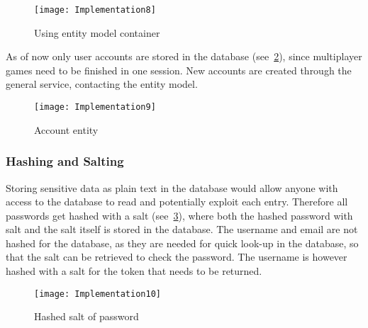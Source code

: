 \begin{figure}[h]
\centerline{\texttt{[image: Implementation8]}}
\caption {Using entity model container}
\label {fig:implementation8}
\end{figure}

As of now only user accounts are stored in the database
(see~\ref{fig:implementation9}), since multiplayer games need to be
 finished in one session. New accounts are created through the general
  service, contacting the entity model.

\begin{figure}[h]
\centerline{\texttt{[image: Implementation9]}}
\caption {Account entity}
\label {fig:implementation9}
\end{figure}

\subsubsection {Hashing and Salting}
Storing sensitive data as plain text in the database would allow
anyone with access to the database to read and potentially exploit
each entry. Therefore all passwords get hashed with a
salt (see~\ref{fig:implementation10}), where both the hashed password with
 salt and the salt itself is stored in the database. The username and email
  are not hashed for the database, as they are needed for quick look-up in
   the database, so that the salt can be retrieved to check the password.
    The username is however hashed with a salt for the token that needs to
     be returned.

\begin{figure}[h]
\centerline{\texttt{[image: Implementation10]}}
\caption {Hashed salt of password}
\label {fig:implementation10}
\end{figure}
